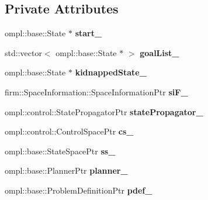 \subsection*{Private Attributes}
\begin{DoxyCompactItemize}
\item 
\hypertarget{class_f_i_r_m2_d_setup_acf22835c3a8d36f167d48fa09da5b50c}{ompl\-::base\-::\-State $\ast$ {\bfseries start\-\_\-}}\label{class_f_i_r_m2_d_setup_acf22835c3a8d36f167d48fa09da5b50c}

\item 
\hypertarget{class_f_i_r_m2_d_setup_adbc2004ee66075989ae5bba496957655}{std\-::vector$<$ ompl\-::base\-::\-State $\ast$ $>$ {\bfseries goal\-List\-\_\-}}\label{class_f_i_r_m2_d_setup_adbc2004ee66075989ae5bba496957655}

\item 
\hypertarget{class_f_i_r_m2_d_setup_ac272c6975621755af048da7e8141eb3d}{ompl\-::base\-::\-State $\ast$ {\bfseries kidnapped\-State\-\_\-}}\label{class_f_i_r_m2_d_setup_ac272c6975621755af048da7e8141eb3d}

\item 
\hypertarget{class_f_i_r_m2_d_setup_aca6f77f17773034b1601da55e08887c8}{firm\-::\-Space\-Information\-::\-Space\-Information\-Ptr {\bfseries si\-F\-\_\-}}\label{class_f_i_r_m2_d_setup_aca6f77f17773034b1601da55e08887c8}

\item 
\hypertarget{class_f_i_r_m2_d_setup_a252653bcbe2e4ea74d6bd88ae0632d0c}{ompl\-::control\-::\-State\-Propagator\-Ptr {\bfseries state\-Propagator\-\_\-}}\label{class_f_i_r_m2_d_setup_a252653bcbe2e4ea74d6bd88ae0632d0c}

\item 
\hypertarget{class_f_i_r_m2_d_setup_a5ba013fe83f799be7cd9486feab9e308}{ompl\-::control\-::\-Control\-Space\-Ptr {\bfseries cs\-\_\-}}\label{class_f_i_r_m2_d_setup_a5ba013fe83f799be7cd9486feab9e308}

\item 
\hypertarget{class_f_i_r_m2_d_setup_af52bd5a96b826244573c39c09bd4f467}{ompl\-::base\-::\-State\-Space\-Ptr {\bfseries ss\-\_\-}}\label{class_f_i_r_m2_d_setup_af52bd5a96b826244573c39c09bd4f467}

\item 
\hypertarget{class_f_i_r_m2_d_setup_a023dd51ae9c8c4eec8221f716cf09a00}{ompl\-::base\-::\-Planner\-Ptr {\bfseries planner\-\_\-}}\label{class_f_i_r_m2_d_setup_a023dd51ae9c8c4eec8221f716cf09a00}

\item 
\hypertarget{class_f_i_r_m2_d_setup_a8b058f8d7ebc41dafa69b88027f7edc9}{ompl\-::base\-::\-Problem\-Definition\-Ptr {\bfseries pdef\-\_\-}}\label{class_f_i_r_m2_d_setup_a8b058f8d7ebc41dafa69b88027f7edc9}


\end{DoxyCompactItemize}
